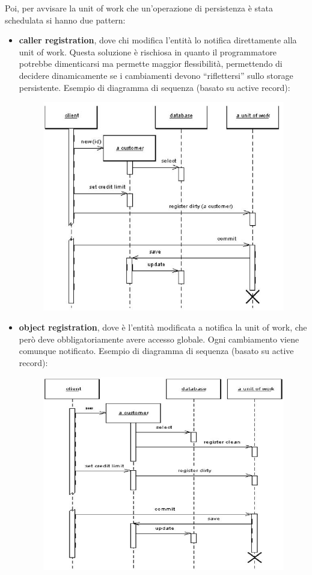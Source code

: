\documentclass[a4paper,12pt, oneside]{book}
\begin{document}
Poi, per avvisare la unit of work che un'operazione di persistenza è stata
schedulata si hanno due pattern:
\begin{itemize}
  \item \textbf{caller registration}, dove chi modifica l'entità lo notifica
  direttamente alla unit of work. Questa soluzione è rischiosa in quanto il
  programmatore potrebbe dimenticarsi ma permette maggior flessibilità,
  permettendo di decidere dinamicamente se i cambiamenti devono ``riflettersi''
  sullo storage persistente. Esempio di diagramma di sequenza (basato su active
  record):
  \begin{figure}[H]
    \centering
    \includegraphics[scale = 0.4]{img/cr.jpg}
  \end{figure}
  \item \textbf{object registration}, dove è l'entità modificata a notifica la
  unit of work, che però deve obbligatoriamente avere accesso globale. Ogni
  cambiamento viene comunque notificato. Esempio di diagramma di sequenza
  (basato su active record):
  \begin{figure}[H]
    \centering
    \includegraphics[scale = 0.4]{img/or.jpg}
  \end{figure}
\end{itemize}
\end{document}
